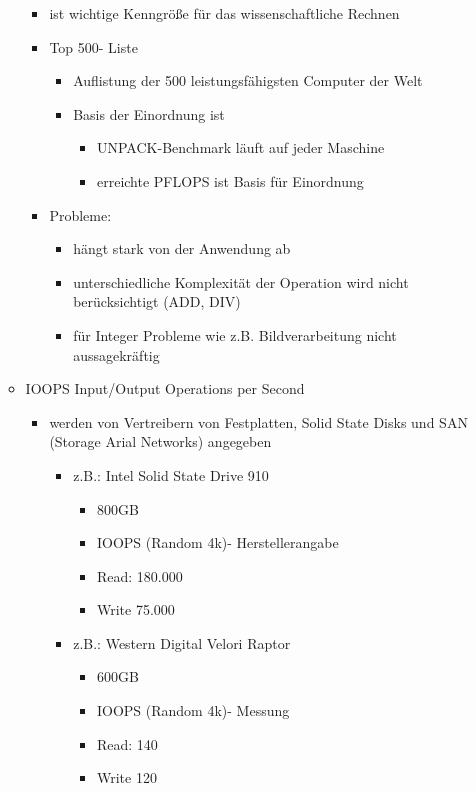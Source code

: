 \begin{enumerate}
\begin{itemize}
		\begin{itemize}
			\item ist wichtige Kenngröße für das wissenschaftliche Rechnen
			\item Top 500- Liste
			\begin{itemize}
				\item Auflistung der 500 leistungsfähigsten Computer der Welt
				\item Basis der Einordnung ist
				\begin{itemize}
					\item UNPACK-Benchmark läuft auf jeder Maschine
					\item erreichte PFLOPS ist Basis für Einordnung
				\end{itemize}
			\end{itemize}
			\item Probleme:
			\begin{itemize}
				\item hängt stark von der Anwendung ab
				\item unterschiedliche Komplexität der Operation wird nicht berücksichtigt (ADD, DIV)
				\item für Integer Probleme wie z.B. Bildverarbeitung nicht aussagekräftig
			\end{itemize}
		\end{itemize}
		\item IOOPS Input/Output Operations per Second
		\begin{itemize}
			\item werden von Vertreibern von Festplatten, Solid State Disks und SAN (Storage Arial Networks) angegeben
			\begin{itemize}
				\item z.B.: Intel Solid State Drive 910
				\begin{itemize}
					\item 800GB
					\item IOOPS (Random 4k)- Herstellerangabe
					\item Read: 180.000
					\item Write 75.000
				\end{itemize}
				\item z.B.: Western Digital Velori Raptor
				\begin{itemize}
					\item 600GB
					\item IOOPS (Random 4k)- Messung
					\item Read: 140
					\item Write 120

\end{itemize}
\end{itemize}
\end{itemize}
\end{itemize}
\end{enumerate}
